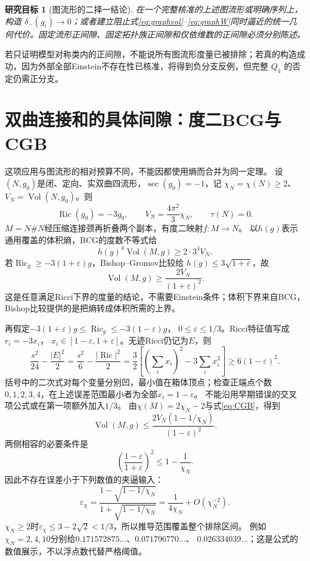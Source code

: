 \documentclass[UTF8,a4paper,11pt,fontset=fandol]{ctexart}
\numberwithin{equation}{section}
\newtheorem{target}[theorem]{研究目标}
\theoremstyle{definition}
\newcommand{\Ric}{\operatorname{Ric}}
\newcommand{\Vol}{\operatorname{Vol}}
\begin{document}
\begin{target}[图流形的二择一结论]
在一个完整核准的上述图流形或明确序列上，构造 $\delta_-(g_i)\to0$；或者建立阻止式\eqref{eq:graphvol}--\eqref{eq:graphW}同时逼近的统一几何代价。固定流形正间隙、固定拓扑族正间隙和仅依维数的正间隙必须分别陈述。
\end{target}
若只证明模型对称类内的正间隙，不能说所有图流形度量已被排除；若真的构造成功，因为外部全部Einstein不存在性已核准，将得到负分支反例，但完整 $Q_4$ 的否定仍需正分支。

\section{双曲连接和的具体间隙：度二BCG与CGB}
这项应用与图流形的相对预算不同，不能因都使用熵而合并为同一定理。
设$(N,g_0)$是闭、定向、实双曲四流形，$\sec(g_0)=-1$，记
$\chi_N=\chi(N)\ge2$、$V_N=\Vol(N,g_0)$。则
\[
 \Ric(g_0)=-3g_0,\qquad V_N=\frac{4\pi^2}{3}\chi_N,
 \qquad\tau(N)=0.
\]
$M=N\#N$经压缩连接颈再折叠两个副本，有度二映射$f:M\to N$。
以$h(g)$表示通用覆盖的体积熵，BCG的度数不等式给
\[
 h(g)^4\Vol(M,g)\ge2\cdot3^4V_N.
\]
若$\Ric_g\ge-3(1+\varepsilon)g$，Bishop--Gromov比较给
$h(g)\le3\sqrt{1+\varepsilon}$，故
\begin{equation}\label{eq:bcg-lower}
 \Vol(M,g)\ge\frac{2V_N}{(1+\varepsilon)^2}.
\end{equation}
这是任意满足Ricci下界的度量的结论，不需要Einstein条件；体积下界来自BCG，
Bishop比较提供的是把熵转成体积所需的上界。

再假定$-3(1+\varepsilon)g\le\Ric_g\le-3(1-\varepsilon)g$，
$0\le\varepsilon\le1/3$。Ricci特征值写成$r_i=-3x_i$，
$x_i\in[1-\varepsilon,1+\varepsilon]$。无迹Ricci仍记为$E$，则
\[
 \frac{s^2}{24}-\frac{|E|^2}{2}
 =\frac{s^2}{6}-\frac{|\Ric|^2}{2}
 =\frac32\left[\left(\sum_i x_i\right)^2-3\sum_i x_i^2\right]
 \ge6(1-\varepsilon)^2.
\]
括号中的二次式对每个变量分别凹，最小值在箱体顶点；检查正端点个数
$0,1,2,3,4$，在上述误差范围最小者为全部$x_i=1-\varepsilon$。
不能沿用早期错误的交叉项公式或在第一项额外加入$1/3$。
由$\chi(M)=2\chi_N-2$与式\eqref{eq:CGB}，得到
\begin{equation}\label{eq:bcg-upper}
 \Vol(M,g)\le
 \frac{2V_N(1-1/\chi_N)}{(1-\varepsilon)^2}.
\end{equation}
两侧相容的必要条件是
\[
 \left(\frac{1-\varepsilon}{1+\varepsilon}\right)^2
 \le1-\frac1{\chi_N}.
\]
因此不存在误差小于下列数值的夹逼输入：
\begin{equation}\label{eq:bcg-threshold}
 \varepsilon_\chi=
 \frac{1-\sqrt{1-1/\chi_N}}{1+\sqrt{1-1/\chi_N}}
 =\frac1{4\chi_N}+O(\chi_N^{-2}).
\end{equation}
$\chi_N\ge2$时$\varepsilon_\chi\le3-2\sqrt2<1/3$，所以推导范围覆盖整个排除区间。
例如$\chi_N=2,4,10$分别给$0.171572875\ldots$、$0.071796770\ldots$、
$0.026334039\ldots$；这是公式的数值展示，不以浮点数代替严格阈值。
\end{document}
